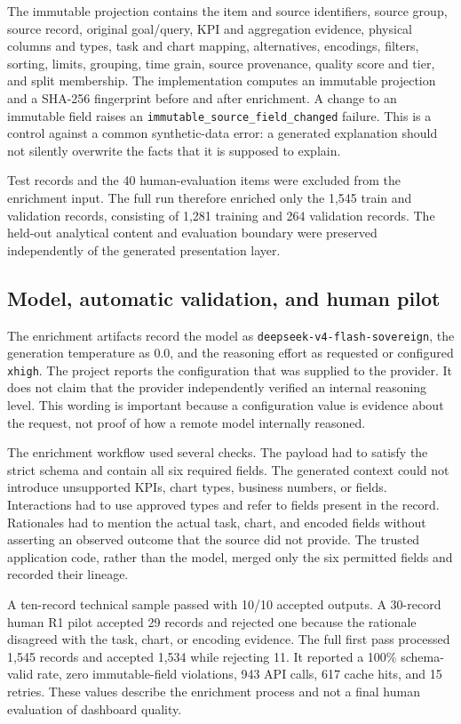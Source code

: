 The immutable projection contains the item and source identifiers, source group, source record, original goal/query, KPI and aggregation evidence, physical columns and types, task and chart mapping, alternatives, encodings, filters, sorting, limits, grouping, time grain, source provenance, quality score and tier, and split membership. The implementation computes an immutable projection and a SHA-256 fingerprint before and after enrichment. A change to an immutable field raises an \nolinkurl{immutable_source_field_changed} failure. This is a control against a common synthetic-data error: a generated explanation should not silently overwrite the facts that it is supposed to explain.

Test records and the 40 human-evaluation items were excluded from the enrichment input. The full run therefore enriched only the 1,545 train and validation records, consisting of 1,281 training and 264 validation records. The held-out analytical content and evaluation boundary were preserved independently of the generated presentation layer.

\subsection{Model, automatic validation, and human pilot}

The enrichment artifacts record the model as \nolinkurl{deepseek-v4-flash-sovereign}, the generation temperature as 0.0, and the reasoning effort as requested or configured \texttt{xhigh}. The project reports the configuration that was supplied to the provider. It does not claim that the provider independently verified an internal reasoning level. This wording is important because a configuration value is evidence about the request, not proof of how a remote model internally reasoned.

The enrichment workflow used several checks. The payload had to satisfy the strict schema and contain all six required fields. The generated context could not introduce unsupported KPIs, chart types, business numbers, or fields. Interactions had to use approved types and refer to fields present in the record. Rationales had to mention the actual task, chart, and encoded fields without asserting an observed outcome that the source did not provide. The trusted application code, rather than the model, merged only the six permitted fields and recorded their lineage.

A ten-record technical sample passed with 10/10 accepted outputs. A 30-record human R1 pilot accepted 29 records and rejected one because the rationale disagreed with the task, chart, or encoding evidence. The full first pass processed 1,545 records and accepted 1,534 while rejecting 11. It reported a 100\% schema-valid rate, zero immutable-field violations, 943 API calls, 617 cache hits, and 15 retries. These values describe the enrichment process and not a final human evaluation of dashboard quality.

